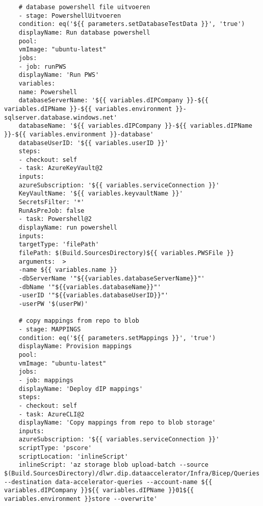 \documentclass[dutch,dit,thesis]{hogentreport}
\begin{document}
\begin{lstlisting}
    # database powershell file uitvoeren
    - stage: PowershellUitvoeren
    condition: eq('${{ parameters.setDatabaseTestData }}', 'true')
    displayName: Run database powershell
    pool:
    vmImage: "ubuntu-latest"
    jobs:
    - job: runPWS
    displayName: 'Run PWS'
    variables:
    name: Powershell
    databaseServerName: '${{ variables.dIPCompany }}-${{ variables.dIPName }}-${{ variables.environment }}-sqlserver.database.windows.net'
    databaseName: '${{ variables.dIPCompany }}-${{ variables.dIPName }}-${{ variables.environment }}-database'
    databaseUserID: '${{ variables.userID }}'
    steps:
    - checkout: self
    - task: AzureKeyVault@2
    inputs:
    azureSubscription: '${{ variables.serviceConnection }}'
    KeyVaultName: '${{ variables.keyvaultName }}'
    SecretsFilter: '*'
    RunAsPreJob: false
    - task: Powershell@2
    displayName: run powershell
    inputs:
    targetType: 'filePath'
    filePath: $(Build.SourcesDirectory)${{ variables.PWSFile }}
    arguments:  >
    -name ${{ variables.name }}
    -dbServerName '"${{variables.databaseServerName}}"'
    -dbName '"${{variables.databaseName}}"'
    -userID '"${{variables.databaseUserID}}"'
    -userPW '$(userPW)'

    # copy mappings from repo to blob
    - stage: MAPPINGS
    condition: eq('${{ parameters.setMappings }}', 'true')
    displayName: Provision mappings
    pool:
    vmImage: "ubuntu-latest"
    jobs:
    - job: mappings
    displayName: 'Deploy dIP mappings'
    steps:
    - checkout: self
    - task: AzureCLI@2
    displayName: 'Copy mappings from repo to blob storage'
    inputs:
    azureSubscription: '${{ variables.serviceConnection }}'
    scriptType: 'pscore'
    scriptLocation: 'inlineScript'
    inlineScript: 'az storage blob upload-batch --source $(Build.SourcesDirectory)/dlwr.dip.dataaccelerator/Infra/Bicep/Queries --destination data-accelerator-queries --account-name ${{ variables.dIPCompany }}${{ variables.dIPName }}01${{ variables.environment }}store --overwrite'
\end{lstlisting}
\end{document}
